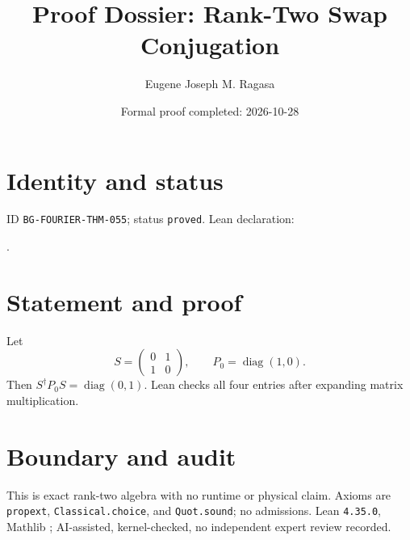 \documentclass[11pt]{article}
\title{Proof Dossier: Rank-Two Swap Conjugation}\author{Eugene Joseph M. Ragasa}\date{Formal proof completed: 2026-10-28}
\begin{document}
\raggedright\maketitle
\section{Identity and status}
ID \texttt{BG-FOURIER-THM-055}; status \texttt{proved}. Lean declaration:
\par{}.
\section{Statement and proof}
Let
\[
S=\begin{pmatrix}0&1\\1&0\end{pmatrix},\qquad P_0=\operatorname{diag}(1,0).
\]
Then $S^\dagger P_0S=\operatorname{diag}(0,1)$. Lean checks all four entries after expanding matrix multiplication.
\section{Boundary and audit}
This is exact rank-two algebra with no runtime or physical claim. Axioms are \texttt{propext},
\texttt{Classical.choice}, and \texttt{Quot.sound}; no admissions. Lean \texttt{4.35.0}, Mathlib
{\scriptsize{}}; AI-assisted, kernel-checked, no independent expert review recorded.
\end{document}
